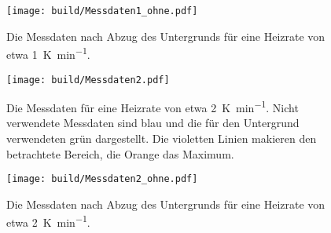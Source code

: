 \begin{figure}[htb]
  \centering
  \texttt{[image: build/Messdaten1\_ohne.pdf]}
  \caption{Die Messdaten nach Abzug des Untergrunds für eine Heizrate von etwa \SI{1}{\kelvin\per\minute}.}
  \label{fig:Messdaten1_ohne}
\end{figure}
\begin{figure}[htb]
  \centering
  \texttt{[image: build/Messdaten2.pdf]}
  \caption{Die Messdaten für eine Heizrate von etwa \SI{2}{\kelvin\per\minute}. Nicht verwendete Messdaten sind blau und die für den Untergrund verwendeten grün dargestellt. Die violetten Linien makieren den betrachtete Bereich, die Orange das Maximum.}
  \label{fig:Messdaten2}
\end{figure}
\begin{figure}[htb]
  \centering
  \texttt{[image: build/Messdaten2\_ohne.pdf]}
  \caption{Die Messdaten nach Abzug des Untergrunds für eine Heizrate von etwa \SI{2}{\kelvin\per\minute}.}
  \label{fig:Messdaten2_ohne}
\end{figure}
\FloatBarrier

